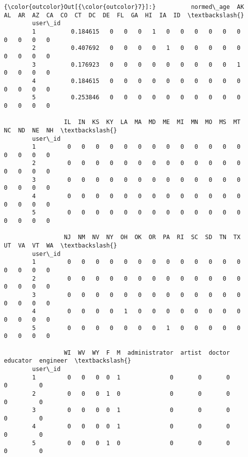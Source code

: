 \documentclass[11pt]{article}
\begin{document}
\begin{Verbatim}[commandchars=\\\{\}]
{\color{outcolor}Out[{\color{outcolor}7}]:}          normed\_age  AK  AL  AR  AZ  CA  CO  CT  DC  DE  FL  GA  HI  IA  ID  \textbackslash{}
        user\_id                                                                       
        1          0.184615   0   0   0   1   0   0   0   0   0   0   0   0   0   0   
        2          0.407692   0   0   0   0   1   0   0   0   0   0   0   0   0   0   
        3          0.176923   0   0   0   0   0   0   0   0   0   1   0   0   0   0   
        4          0.184615   0   0   0   0   0   0   0   0   0   0   0   0   0   0   
        5          0.253846   0   0   0   0   0   0   0   0   0   0   0   0   0   0   
        
                 IL  IN  KS  KY  LA  MA  MD  ME  MI  MN  MO  MS  MT  NC  ND  NE  NH  \textbackslash{}
        user\_id                                                                       
        1         0   0   0   0   0   0   0   0   0   0   0   0   0   0   0   0   0   
        2         0   0   0   0   0   0   0   0   0   0   0   0   0   0   0   0   0   
        3         0   0   0   0   0   0   0   0   0   0   0   0   0   0   0   0   0   
        4         0   0   0   0   0   0   0   0   0   0   0   0   0   0   0   0   0   
        5         0   0   0   0   0   0   0   0   0   0   0   0   0   0   0   0   0   
        
                 NJ  NM  NV  NY  OH  OK  OR  PA  RI  SC  SD  TN  TX  UT  VA  VT  WA  \textbackslash{}
        user\_id                                                                       
        1         0   0   0   0   0   0   0   0   0   0   0   0   0   0   0   0   0   
        2         0   0   0   0   0   0   0   0   0   0   0   0   0   0   0   0   0   
        3         0   0   0   0   0   0   0   0   0   0   0   0   0   0   0   0   0   
        4         0   0   0   0   1   0   0   0   0   0   0   0   0   0   0   0   0   
        5         0   0   0   0   0   0   0   1   0   0   0   0   0   0   0   0   0   
        
                 WI  WV  WY  F  M  administrator  artist  doctor  educator  engineer  \textbackslash{}
        user\_id                                                                        
        1         0   0   0  0  1              0       0       0         0         0   
        2         0   0   0  1  0              0       0       0         0         0   
        3         0   0   0  0  1              0       0       0         0         0   
        4         0   0   0  0  1              0       0       0         0         0   
        5         0   0   0  1  0              0       0       0         0         0   
        

\end{Verbatim}
\end{document}
